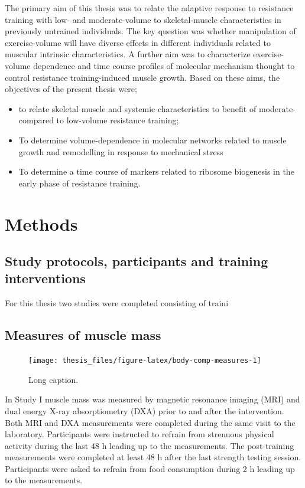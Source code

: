\documentclass[twoside,10pt]{gihclass} %
\providecommand{\tightlist}{%
  \setlength{\itemsep}{0pt}\setlength{\parskip}{0pt}}
\begin{document}
The primary aim of this thesis was to relate the adaptive response to resistance training with low- and moderate-volume to skeletal-muscle characteristics in previously untrained individuals. The key question was whether manipulation of exercise-volume will have diverse effects in different individuals related to muscular intrinsic characteristics. A further aim was to characterize exercise-volume dependence and time course profiles of molecular mechanism thought to control resistance training-induced muscle growth. Based on these aims, the objectives of the present thesis were;
\begin{itemize}
\tightlist
\item
  to relate skeletal muscle and systemic characteristics to benefit of moderate- compared to low-volume resistance training;
\item
  To determine volume-dependence in molecular networks related to muscle growth and remodelling in response to mechanical stress
\item
  To determine a time course of markers related to ribosome biogenesis in the early phase of resistance training.
\end{itemize}
\hypertarget{methods}{%
\chapter{Methods}\label{methods}}

\hypertarget{study-protocols-participants-and-training-interventions}{%
\section{Study protocols, participants and training interventions}\label{study-protocols-participants-and-training-interventions}}

For this thesis two studies were completed consisting of traini

\hypertarget{measures-of-muscle-mass}{%
\section{Measures of muscle mass}\label{measures-of-muscle-mass}}
\begin{figure}
\texttt{[image: thesis\_files/figure-latex/body-comp-measures-1]} \caption[Short caption]{Long caption.}\label{fig:body-comp-measures}
\end{figure}
In Study I muscle mass was measured by magnetic resonance imaging (MRI) and dual energy X-ray absorptiometry (DXA) prior to and after the intervention. Both MRI and DXA measurements were completed during the same visit to the laboratory. Participants were instructed to refrain from strenuous physical activity during the last 48 h leading up to the measurements. The post-training measurements were completed at least 48 h after the last strength testing session. Participants were asked to refrain from food consumption during 2 h leading up to the measurements.
\end{document}
